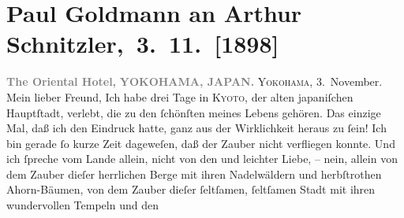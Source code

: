 

         
         \renewcommand{\erwaehntePersonen}{Personen: Marie Reinhard}
         \renewcommand{\erwaehnteOrte}{Orte: Japan, Kyoto, The Oriental Hotel, Wien, Yokohama}
         \renewcommand{\erwaehnteWerke}{}
               \section[ Paul Goldmann an Arthur Schnitzler, 3. 11. {[}1898{]}]{ Paul Goldmann an Arthur Schnitzler, 3. 11. {[}1898{]}}\nopagebreak{}\rehead{ }\begin{ledgroupsized}[t]{13cm}\normalsize\beginnumbering \toendnotes[C]{\smallbreak\pagebreak[2]} 
\toendnotes[C]{\smallbreak}\pstart
           \noindent{}{\pb}\textcolor{gray}{\textbf{The Oriental Hotel,}}\pend
           \pstart
           \textcolor{gray}{\textbf{YOKOHAMA, JAPAN.}}\pend
           \pstart
           \raggedleft{}\textsc{Yokohama}, 3. November.\pend
           \pstart\center{}Mein lieber Freund,\pend\pstart
           Ich habe drei Tage in \textsc{Kyoto}, der alten japaniſchen Hauptſtadt, verlebt, die zu den ſchönſten
               meines Lebens gehören. Das einzige Mal, daß ich den Eindruck hatte, ganz aus der
               Wirklichkeit heraus zu ſein! Ich bin gerade ſo kurze Zeit dageweſen, daß der Zauber
               nicht verfliegen konnte. Und ich ſpreche vom Lande allein,  nicht von den \label{K_L02864-3v}\label{K_L02864-3h} und leichter Liebe, – nein, allein von dem Zauber dieſer
               herrlichen Berge mit ihren Nadelwäldern und herbſtrothen Ahorn-Bäumen, von dem {\pb}Zauber dieſer ſeltſamen, ſeltſamen Stadt mit ihren wundervollen  Tempeln und den

\end{ledgroupsized}
